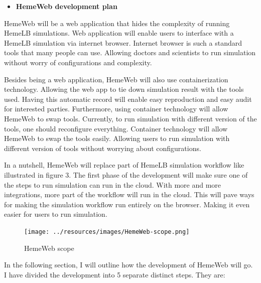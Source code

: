 \documentclass[]{article}
\providecommand{\tightlist}{%
  \setlength{\itemsep}{0pt}\setlength{\parskip}{0pt}}
\begin{document}
\begin{itemize}
\tightlist
\item
  \textbf{HemeWeb development plan}
\end{itemize}

HemeWeb will be a web application that hides the complexity of running
HemeLB simulations. Web application will enable users to interface with
a HemeLB simulation via internet browser. Internet browser is such a
standard tools that many people can use. Allowing doctors and scientists
to run simulation without worry of configurations and complexity.

Besides being a web application, HemeWeb will also use containerization
technology. Allowing the web app to tie down simulation result with the
tools used. Having this automatic record will enable easy reproduction
and easy audit for interested parties. Furthermore, using container
technology will allow HemeWeb to swap tools. Currently, to run
simulation with different version of the tools, one should reconfigure
everything. Container technology will allow HemeWeb to swap the tools
easily. Allowing users to run simulation with different version of tools
without worrying about configurations.

In a nutshell, HemeWeb will replace part of HemeLB simulation workflow
like illustrated in figure 3. The first phase of the development will
make sure one of the steps to run simulation can run in the cloud. With
more and more integrations, more part of the workflow will run in the
cloud. This will pave ways for making the simulation workflow run
entirely on the browser. Making it even easier for users to run
simulation.

\begin{figure}[H]
\centering
\texttt{[image: ../resources/images/HemeWeb-scope.png]}
\caption{HemeWeb scope}
\end{figure}

In the following section, I will outline how the development of HemeWeb
will go. I have divided the development into 5 separate distinct steps.
They are:
\end{document}
